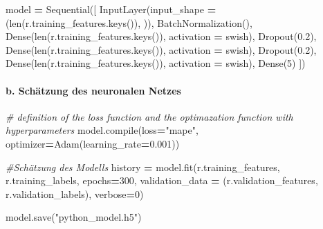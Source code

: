 \documentclass[
]{article}
\newenvironment{Shaded}{\begin{snugshade}}{\end{snugshade}}
\newcommand{\BuiltInTok}[1]{#1}
\newcommand{\CommentTok}[1]{\textcolor[rgb]{0.56,0.35,0.01}{\textit{#1}}}
\newcommand{\DecValTok}[1]{\textcolor[rgb]{0.00,0.00,0.81}{#1}}
\newcommand{\FloatTok}[1]{\textcolor[rgb]{0.00,0.00,0.81}{#1}}
\newcommand{\NormalTok}[1]{#1}
\newcommand{\OperatorTok}[1]{\textcolor[rgb]{0.81,0.36,0.00}{\textbf{#1}}}
\newcommand{\StringTok}[1]{\textcolor[rgb]{0.31,0.60,0.02}{#1}}
\begin{document}
\begin{Shaded}
\begin{Highlighting}[]

\NormalTok{model }\OperatorTok{=}\NormalTok{ Sequential([}
\NormalTok{  InputLayer(input\_shape }\OperatorTok{=}\NormalTok{ (}\BuiltInTok{len}\NormalTok{(r.training\_features.keys()), )),}
\NormalTok{  BatchNormalization(),}
\NormalTok{  Dense(}\BuiltInTok{len}\NormalTok{(r.training\_features.keys()), activation }\OperatorTok{=} \StringTok{\textquotesingle{}swish\textquotesingle{}}\NormalTok{),}
\NormalTok{  Dropout(}\FloatTok{0.2}\NormalTok{),}
\NormalTok{  Dense(}\BuiltInTok{len}\NormalTok{(r.training\_features.keys()), activation }\OperatorTok{=} \StringTok{\textquotesingle{}swish\textquotesingle{}}\NormalTok{),}
\NormalTok{  Dropout(}\FloatTok{0.2}\NormalTok{),}
\NormalTok{  Dense(}\BuiltInTok{len}\NormalTok{(r.training\_features.keys()), activation }\OperatorTok{=} \StringTok{\textquotesingle{}swish\textquotesingle{}}\NormalTok{),}
\NormalTok{  Dense(}\DecValTok{5}\NormalTok{)}
\NormalTok{])}
\end{Highlighting}
\end{Shaded}

\hypertarget{b.-schuxe4tzung-des-neuronalen-netzes}{%
\paragraph{b. Schätzung des neuronalen
Netzes}\label{b.-schuxe4tzung-des-neuronalen-netzes}}

\begin{Shaded}
\begin{Highlighting}[]
\CommentTok{\# definition of the loss function and the optimazation function with hyperparameters}
\NormalTok{model.}\BuiltInTok{compile}\NormalTok{(loss}\OperatorTok{=}\StringTok{"mape"}\NormalTok{, optimizer}\OperatorTok{=}\NormalTok{Adam(learning\_rate}\OperatorTok{=}\FloatTok{0.001}\NormalTok{))}

\CommentTok{\#Schätzung des Modells}
\NormalTok{history }\OperatorTok{=}\NormalTok{ model.fit(r.training\_features, r.training\_labels, epochs}\OperatorTok{=}\DecValTok{300}\NormalTok{,}
\NormalTok{                    validation\_data }\OperatorTok{=}\NormalTok{ (r.validation\_features, r.validation\_labels), verbose}\OperatorTok{=}\DecValTok{0}\NormalTok{)}

\NormalTok{model.save(}\StringTok{"python\_model.h5"}\NormalTok{)}
\end{Highlighting}
\end{Shaded}
\end{document}

